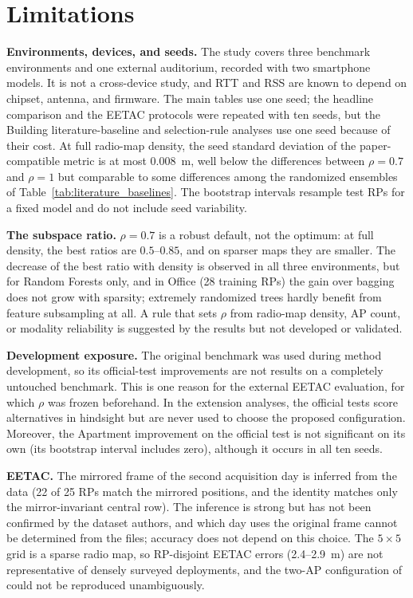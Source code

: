 \section{Limitations}
\label{sec:limitations}

\textbf{Environments, devices, and seeds.} The study covers three benchmark environments and one external auditorium, recorded with two smartphone models. It is not a cross-device study, and RTT and RSS are known to depend on chipset, antenna, and firmware. The main tables use one seed; the headline comparison and the EETAC protocols were repeated with ten seeds, but the Building literature-baseline and selection-rule analyses use one seed because of their cost. At full radio-map density, the seed standard deviation of the paper-compatible metric is at most $0.008$~m, well below the differences between $\rho=0.7$ and $\rho=1$ but comparable to some differences among the randomized ensembles of Table~\ref{tab:literature_baselines}. The bootstrap intervals resample test RPs for a fixed model and do not include seed variability.

\textbf{The subspace ratio.} $\rho=0.7$ is a robust default, not the optimum: at full density, the best ratios are $0.5$--$0.85$, and on sparser maps they are smaller. The decrease of the best ratio with density is observed in all three environments, but for Random Forests only, and in Office (28 training RPs) the gain over bagging does not grow with sparsity; extremely randomized trees hardly benefit from feature subsampling at all. A rule that sets $\rho$ from radio-map density, AP count, or modality reliability is suggested by the results but not developed or validated.

\textbf{Development exposure.} The original benchmark was used during method development, so its official-test improvements are not results on a completely untouched benchmark. This is one reason for the external EETAC evaluation, for which $\rho$ was frozen beforehand. In the extension analyses, the official tests score alternatives in hindsight but are never used to choose the proposed configuration. Moreover, the Apartment improvement on the official test is not significant on its own (its bootstrap interval includes zero), although it occurs in all ten seeds.

\textbf{EETAC.} The mirrored frame of the second acquisition day is inferred from the data (22 of 25 RPs match the mirrored positions, and the identity matches only the mirror-invariant central row). The inference is strong but has not been confirmed by the dataset authors, and which day uses the original frame cannot be determined from the files; accuracy does not depend on this choice. The $5\times5$ grid is a sparse radio map, so RP-disjoint EETAC errors (2.4--2.9~m) are not representative of densely surveyed deployments, and the two-AP configuration of~\cite{gonzalezdiaz2026scalable} could not be reproduced unambiguously.

